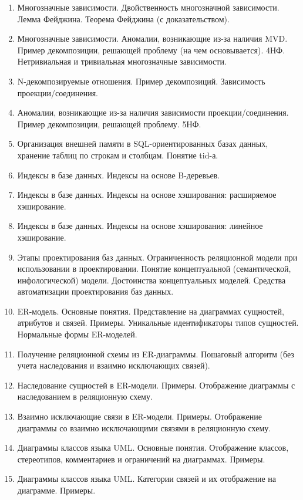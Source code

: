 \documentclass[a4paper,12pt]{article}
\begin{document}
\begin{titlepage}
\begin{multicols}{3}
\begin{enumerate}[label=\arabic*.]
            \item Многозначные зависимости. Двойственность многозначной зависимости. Лемма Фейджина. Теорема Фейджина (с доказательством).
            \item Многозначные зависимости. Аномалии, возникающие из-за наличия MVD. Пример декомпозиции, решающей проблему (на чем основывается). 4НФ. Нетривиальная и тривиальная многозначные зависимости.
            \item N-декомпозируемые отношения. Пример декомпозиций. Зависимость проекции/соединения.
            \item Аномалии, возникающие из-за наличия зависимости проекции/соединения. Пример декомпозиции, решающей проблему. 5НФ.
            \item Организация внешней памяти в SQL-ориентированных базах данных, хранение таблиц по строкам и столбцам. Понятие tid-а.
            \item Индексы в базе данных. Индексы на основе B-деревьев.
            \item Индексы в базе данных. Индексы на основе хэширования: расширяемое хэширование.
            \item Индексы в базе данных. Индексы на основе хэширования: линейное хэширование.
            \item Этапы проектирования баз данных. Ограниченность реляционной модели при использовании в проектировании. Понятие концептуальной (семантической, инфологической) модели. Достоинства концептуальных моделей. Средства автоматизации проектирования баз данных.
            \item ER-модель. Основные понятия. Представление на диаграммах сущностей, атрибутов и связей. Примеры. Уникальные идентификаторы типов сущностей. Нормальные формы ER-моделей.
            \item Получение реляционной схемы из ER-диаграммы. Пошаговый алгоритм (без учета наследования и взаимно исключающих связей).
            \item Наследование сущностей в ER-модели. Примеры. Отображение диаграммы с наследованием в реляционную схему.
            \item Взаимно исключающие связи в ER-модели. Примеры. Отображение диаграммы со взаимно исключающими связями в реляционную схему.
            \item Диаграммы классов языка UML. Основные понятия. Отображение классов, стереотипов, комментариев и ограничений на диаграммах. Примеры.
            \item Диаграммы классов языка UML. Категории связей и их отображение на диаграмме. Примеры.

\end{enumerate}
\end{multicols}
\end{titlepage}
\end{document}
